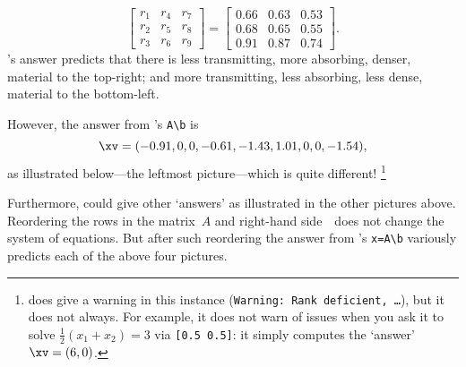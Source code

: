 \begin{example}
{}
\begin{equation*}
\begin{bmatrix} r_1&r_4&r_7\\r_2&r_5&r_8\\r_3&r_6&r_9 \end{bmatrix}
=\begin{bmatrix} 0.66&0.63&0.53
\\0.68&0.65&0.55
\\0.91&0.87&0.74
 \end{bmatrix}.
\end{equation*}
\script[2]'s answer predicts that there is less transmitting, more absorbing, denser, material to the top-right; and more transmitting, less absorbing, less dense, material to the bottom-left.

However, the answer from \script[1]'s \verb|A\b| is \twodp
\begin{equation*}
\xv=\small(-0.91,0,0,-0.61,-1.43,1.01,0,0,-1.54),
\end{equation*}
as illustrated below---the leftmost picture---which is quite different!
\footnote{\script[1] does give a warning in this instance (\texttt{Warning: Rank deficient, \ldots}), but it does not always. 
For example, it does not warn of issues when you ask it to solve \(\frac12(x_1+x_2)=3\) via \texttt{[0.5 0.5]}: it simply computes the `answer' \(\xv=(6,0)\).}
\begin{center}
\hfil
{}
\hfil
{}
\hfil
{}
\end{center}
Furthermore, \script[1] could give other `answers' as illustrated in the other pictures above. 
Reordering the rows in the matrix~\(A\) and right-hand side~\bv\  does not change the system of equations.
But after such reordering the answer from \script[1]'s \verb|x=A\b|  variously predicts each of the above four pictures.


\end{example}
